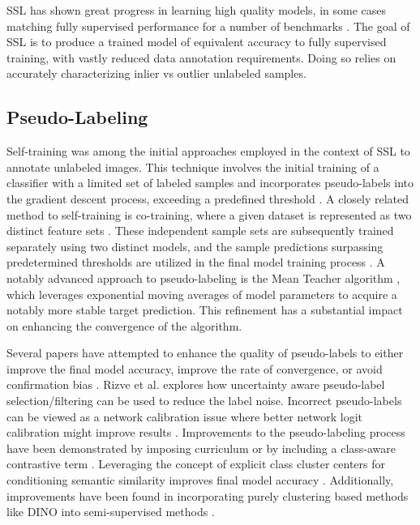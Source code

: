 \documentclass[10pt,twocolumn,letterpaper]{article}
\begin{document}

SSL has shown great progress in learning high quality models, in some cases matching fully supervised performance for a number of benchmarks \cite{zhang2021flexmatch}.
The goal of SSL is to produce a trained model of equivalent accuracy to fully supervised training, with vastly reduced data annotation requirements.
Doing so relies on accurately characterizing inlier vs outlier unlabeled samples.

\subsection{Pseudo-Labeling}
Self-training was among the initial approaches employed in the context of SSL to annotate unlabeled images. 
This technique involves the initial training of a classifier with a limited set of labeled samples and incorporates pseudo-labels into the gradient descent process, exceeding a predefined threshold \cite{yarowsky1995unsupervised, mcclosky2006reranking, olivier2006semi,zhai2019s4l,livieris2019predicting,rosenberg2005semi,menon2020deep}. 
A closely related method to self-training is co-training, where a given dataset is represented as two distinct feature sets \cite{blum1998combining}. 
These independent sample sets are subsequently trained separately using two distinct models, and the sample predictions surpassing predetermined thresholds are utilized in the final model training process \cite{blum1998combining,prakash2014survey}.
A notably advanced approach to pseudo-labeling is the Mean Teacher algorithm \cite{tarvainen2017mean}, which leverages exponential moving averages of model parameters to acquire a notably more stable target prediction. 
This refinement has a substantial impact on enhancing the convergence of the algorithm.

Several papers have attempted to enhance the quality of pseudo-labels to either improve the final model accuracy, improve the rate of convergence, or avoid confirmation bias \cite{arazo2020pseudo}.
Rizve et al. \cite{rizve2021defense} explores how uncertainty aware pseudo-label selection/filtering can be used to reduce the label noise.
Incorrect pseudo-labels can be viewed as a network calibration issue \cite{rizve2021defense} where better network logit calibration might improve results \cite{Xing2020DistanceBased}.
Improvements to the pseudo-labeling process have been demonstrated by imposing curriculum \cite{zhang2021flexmatch} or by including a class-aware contrastive term \cite{yang2022class}.
Leveraging the concept of explicit class cluster centers for conditioning semantic similarity improves final model accuracy \cite{zheng2022simmatch}.
Additionally, improvements have been found in incorporating purely clustering based methods like DINO \cite{caron2021emerging} into semi-supervised methods \cite{fini2023semi}.
\end{document}

